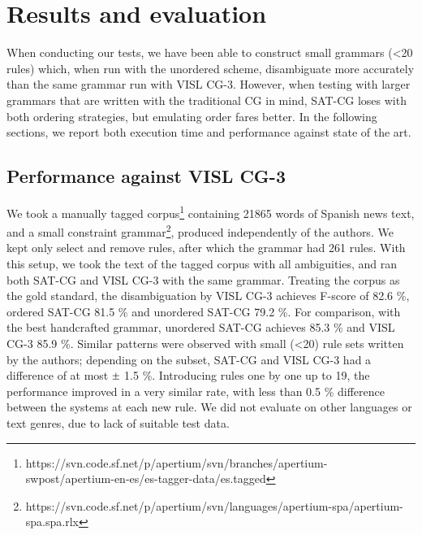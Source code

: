 \documentclass[11pt]{article}
\newcommand{\Mypm}{\mathbin{\tikz [x=1.4ex,y=1.4ex,line width=.1ex] \draw (0.0,0) -- (1.0,0) (0.5,0.08) -- (0.5,0.92) (0.0,0.5) -- (1.0,0.5);}}%
\begin{document}
\section{Results and evaluation}
\label{sec:eval}

When conducting our tests, we have been able to construct small
grammars (\textless20 rules) which, when run with the unordered scheme,
disambiguate more accurately than the same grammar run with VISL
CG-3. However, when testing with larger grammars that are written with the
traditional CG in mind, SAT-CG loses with both ordering strategies, but emulating
order fares better.
In the following sections, we report both execution time and
performance against state of the art.




\subsection{Performance against VISL CG-3}


We took a manually tagged
corpus\footnote{https://svn.code.sf.net/p/apertium/svn/branches/apertium-swpost/apertium-en-es/es-tagger-data/es.tagged}
containing 21865 words of Spanish news text, 
and a small constraint grammar\footnote{https://svn.code.sf.net/p/apertium/svn/languages/apertium-spa/apertium-spa.spa.rlx}, produced independently of the authors.
We kept only select and remove rules, after which the grammar had 261 rules.
With this setup, we took the text of the tagged corpus with all
ambiguities, and ran both SAT-CG and VISL CG-3 with the same grammar. 
Treating the corpus as the gold standard, the disambiguation by  VISL
CG-3 achieves F-score of 82.6 \%, ordered
SAT-CG 81.5 \%  and unordered SAT-CG 79.2 \%. 
For comparison, with the best handcrafted grammar, unordered SAT-CG
achieves 85.3 \% and VISL CG-3 85.9 \%.
Similar patterns were observed with small (\textless{}20) rule sets
written by the authors; depending on the subset, SAT-CG and VISL CG-3 had
a difference of at most $\Mypm$ 1.5 \%. 
Introducing rules one by one up to 19, the
performance improved in a very similar rate, with less than 0.5 \%
difference between the systems at each new rule.
We did not evaluate on other languages or text genres, due to lack of suitable test data.
\end{document}
